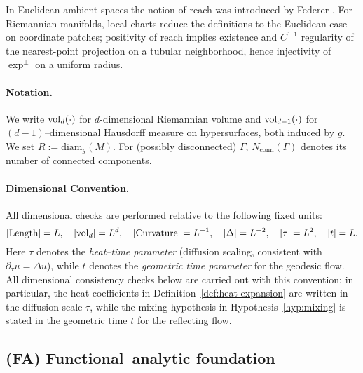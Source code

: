\begin{remark}\label{rem:reach-ref}
In Euclidean ambient spaces the notion of reach was introduced by Federer \cite[Ann.\ of Math.\ (1959), §4.18]{Federer1959}.
For Riemannian manifolds, local charts reduce the definitions to the Euclidean case on coordinate patches; positivity of reach implies existence and $C^{1,1}$ regularity of the nearest-point projection on a tubular neighborhood, hence injectivity of $\exp^\perp$ on a uniform radius.
\end{remark}

\paragraph{Notation.}
We write $\operatorname{vol}_d(\cdot)$ for $d$-dimensional Riemannian volume and
$\operatorname{vol}_{d-1}(\cdot)$ for $(d-1)$–dimensional Hausdorff measure on hypersurfaces, both induced by $g$.
We set $R:=\mathrm{diam}_g(M)$.
For (possibly disconnected) $\Gamma$, $N_{\mathrm{conn}}(\Gamma)$ denotes its number of connected components.

\paragraph{Dimensional Convention.}
All dimensional checks are performed relative to the following fixed units:
\[
[{\rm Length}]=L,\quad [\operatorname{vol}_d]=L^d,\quad [{\rm Curvature}]=L^{-1},\quad [\Delta]=L^{-2},\quad [\tau]=L^2,\quad [t]=L.
\]
Here $\tau$ denotes the \emph{heat–time parameter} (diffusion scaling, consistent with $\partial_\tau u=\Delta u$),
while $t$ denotes the \emph{geometric time parameter} for the geodesic flow.
All dimensional consistency checks below are carried out with this convention; in particular, the heat coefficients in Definition~\ref{def:heat-expansion} are written in the diffusion scale $\tau$, while the mixing hypothesis in Hypothesis~\ref{hyp:mixing} is stated in the geometric time $t$ for the reflecting flow.

\subsection{(FA) Functional–analytic foundation}

